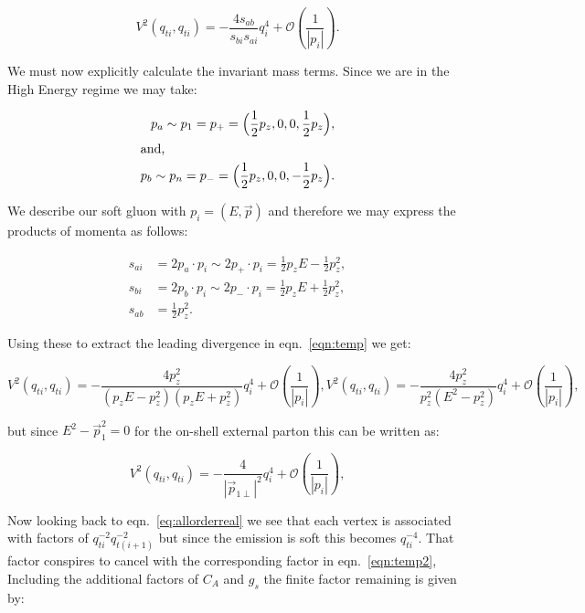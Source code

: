 			\begin{equation}
				V^2(q_{ti}, q_{ti}) = - \frac{4s_{ab}}{s_{bi}s_{ai}}q^4_{i} + \mathcal{O}\left(\frac{1}{|p_i|}\right).
				\label{eqn:temp}
			\end{equation}

			We must now explicitly calculate the invariant mass terms.  Since we are in the
			High Energy regime we may take:

			\begin{align}
				p_a\sim p_1 = p_+ = \Big(\frac12 p_z, 0, 0, \frac12 p_z\Big),\\
				\intertext{and,}
				p_b\sim p_n = p_- = \Big(\frac12 p_z, 0, 0, -\frac12 p_z\Big).
			\end{align}

			We describe our soft gluon with $p_i=(E, \vec{p})$ and therefore we may express the
			products of momenta as follows:

			\begin{align}
				s_{ai} &= 2p_a\cdot p_i\sim2p_+\cdot p_i = \frac12p_zE - \frac12p_z^2,\\
				s_{bi} &= 2p_b\cdot p_i\sim2p_-\cdot p_i = \frac12p_zE + \frac12p_z^2,\\
				s_{ab} &= \frac12p_z^2.
			\end{align}

			Using these to extract the leading divergence in eqn.~\eqref{eqn:temp} we get:

			\begin{subequations}
				\begin{equation}
				V^2(q_{ti}, q_{ti}) = - \frac{4p_z^2}{(p_zE - p_z^2)(p_zE + p_z^2)}q^4_{i} + \mathcal{O}\left(\frac{1}{|p_i|}\right),
				\end{equation}
				\begin{equation}
				V^2(q_{ti}, q_{ti}) = - \frac{4p_z^2}{p_z^2(E^2-p_z^2)}q^4_{i} + \mathcal{O}\left(\frac{1}{|p_i|}\right),
				\end{equation}
			\end{subequations}

			but since $E^2-\vec{p}_1^2=0$ for the on-shell external parton this can be written as:

			\begin{equation}
				V^2(q_{ti}, q_{ti}) = - \frac{4}{|\vec{p}_{1\perp}|^2}q^4_{i} + \mathcal{O}\left(\frac{1}{|p_i|}\right),
				\label{eqn:temp2}
			\end{equation}

			Now looking back to eqn.~\eqref{eq:allorderreal} we see that each vertex is associated with factors of
			$q^{-2}_{ti}q^{-2}_{t(i+1)}$ but since the emission is soft this becomes $q^{-4}_{ti}$.
			That factor conspires to cancel with the corresponding factor in eqn.~\eqref{eqn:temp2},
			Including the additional factors of $C_A$ and $g_s$ the finite factor remaining is given by:

